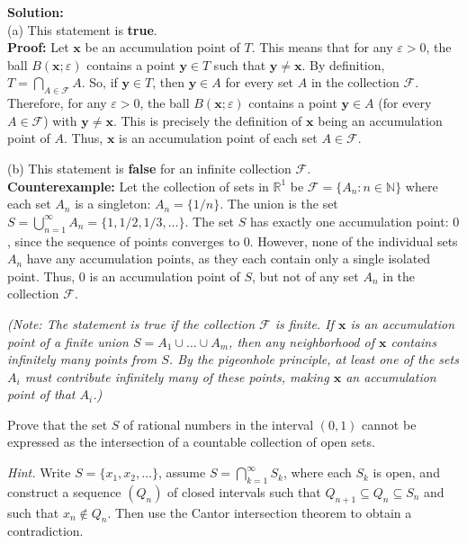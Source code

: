 \textbf{Solution:}\\
(a) This statement is \textbf{true}.\\
\textbf{Proof:} Let $\mathbf{x}$ be an accumulation point of $T$. This means that for any $\varepsilon > 0$, the ball $B(\mathbf{x}; \varepsilon)$ contains a point $\mathbf{y} \in T$ such that $\mathbf{y} \neq \mathbf{x}$. By definition, $T = \bigcap_{A \in \mathcal{F}} A$. So, if $\mathbf{y} \in T$, then $\mathbf{y} \in A$ for every set $A$ in the collection $\mathcal{F}$. Therefore, for any $\varepsilon > 0$, the ball $B(\mathbf{x}; \varepsilon)$ contains a point $\mathbf{y} \in A$ (for every $A \in \mathcal{F}$) with $\mathbf{y} \neq \mathbf{x}$. This is precisely the definition of $\mathbf{x}$ being an accumulation point of $A$. Thus, $\mathbf{x}$ is an accumulation point of each set $A \in \mathcal{F}$.

(b) This statement is \textbf{false} for an infinite collection $\mathcal{F}$.\\
\textbf{Counterexample:} Let the collection of sets in $\mathbb{R}^1$ be $\mathcal{F} = \{A_n : n \in \mathbb{N}\}$ where each set $A_n$ is a singleton: $A_n = \{1/n\}$.
The union is the set $S = \bigcup_{n=1}^{\infty} A_n = \{1, 1/2, 1/3, \dots\}$.
The set $S$ has exactly one accumulation point: $0$, since the sequence of points converges to $0$.
However, none of the individual sets $A_n$ have any accumulation points, as they each contain only a single isolated point.
Thus, $0$ is an accumulation point of $S$, but not of any set $A_n$ in the collection $\mathcal{F}$.

\textit{(Note: The statement is true if the collection $\mathcal{F}$ is finite. If $\mathbf{x}$ is an accumulation point of a finite union $S = A_1 \cup \dots \cup A_m$, then any neighborhood of $\mathbf{x}$ contains infinitely many points from $S$. By the pigeonhole principle, at least one of the sets $A_i$ must contribute infinitely many of these points, making $\mathbf{x}$ an accumulation point of that $A_i$.)}


\begin{problembox}
Prove that the set \( S \) of rational numbers in the interval \( (0, 1) \) cannot be expressed as the intersection of a countable collection of open sets. 

\textit{Hint.} Write \( S = \{x_1, x_2, \ldots\} \), assume \( S = \bigcap_{k=1}^{\infty} S_k \), where each \( S_k \) is open, and construct a sequence \( (Q_n) \) of closed intervals such that \( Q_{n+1} \subseteq Q_n \subseteq S_n \) and such that \( x_n \notin Q_n \). Then use the Cantor intersection theorem to obtain a contradiction.
\end{problembox}

